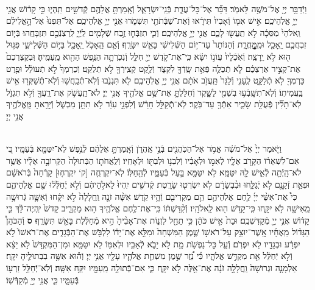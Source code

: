 \documentclass[twoside, openany, parskip=half, 11pt]{book}
\begin{document}
\begin{footnotesize}
\begin{multicols}{2}
\\
וַיְֿדַבֵּ֥ר יְיָ֖ אֶל־מֹשֶׁ֥ה לֵּאמֹֽר׃ דַּבֵּ֞ר אֶל־כׇּל־עֲדַ֧ת בְּֿנֵֽי־יִשְׂרָאֵ֛ל וְֿאָֽמַרְתָּ֥ אֲלֵהֶ֖ם קְֿדשִׁ֣ים תִּֽהְי֑וּ כִּ֣י קָד֔וֹשׁ אֲנִ֖י יְיָ֥ אֱלֹֽהֵיכֶֽם׃ אִ֣ישׁ אִמּ֤וֹ וְֿאָבִיו֙ תִּירָ֔אוּ וְֿאֶת־שַׁבְּֿתֹתַ֖י תִּשְׁמֹ֑רוּ אֲנִ֖י יְיָ֥ אֱלֹֽהֵיכֶֽם׃ אַל־תִּפְנוּ֙ אֶל־הָ֣אֱלִילִ֔ם וֵֽאלֹהֵי֙ מַסֵּכָ֔ה לֹ֥א תַֽעֲשׂ֖וּ לָכֶ֑ם אֲנִ֖י יְיָ֥ אֱלֹֽהֵיכֶֽם׃  וְֿכִ֧י תִזְבְּֿח֛וּ זֶ֥בַח שְֿׁלָמִ֖ים לַֽיְֿיָ֑ לִֽרְצֹֽנְֿכֶ֖ם תִּזְבָּחֻֽהוּ׃ בְּֿי֧וֹם זִבְחֲכֶ֛ם יֵֽאָכֵ֖ל וּמִֽמׇׇׇׇׇׇָּֽחֳרָ֑ת וְֿהַנּוֹתָר֙ עַד־י֣וֹם הַשְּֿׁלִישִׁ֔י בָּאֵ֖שׁ יִשָּׂרֵֽף׃ וְֿאִ֛ם הֵֽאָכֹ֥ל יֵֽאָכֵ֖ל בַּיּ֣וֹם הַשְּֿׁלִישִׁ֑י פִּגּ֥וּל ה֖וּא לֹ֥א יֵֽרָצֶֽה׃ וְֿאֹֽכְֿלָיו֙ עֲוֹנ֣וֹ יִשָּׂ֔א כִּֽי־אֶת־קֹ֥דֶשׁ יְיָ֖ חִלֵּ֑ל וְֿנִכְרְתָ֛ה הַנֶּ֥פֶשׁ הַהִ֖וא מֵֽעַמֶּֽיהָ׃ וּֽבְקֻצְרְכֶם֙ אֶת־קְצִ֣יר אַרְצְכֶ֔ם לֹ֧א תְֿכַלֶּ֛ה פְּֿאַ֥ת שָֽׂדְֿךָ֖ לִקְצֹ֑ר וְֿלֶ֥קֶט קְֿצִֽירְֿךָ֖ לֹ֥א תְֿלַקֵּֽט׃ וְֿכַרְמְךָ֙ לֹ֣א תְֿעוֹלֵ֔ל וּפֶ֥רֶט כַּרְמְךָ֖ לֹ֣א תְֿלַקֵּ֑ט לֶֽעָנִ֤י וְֿלַגֵּר֙ תַּֽעֲזֹ֣ב אֹתָ֔ם אֲנִ֖י יְיָ֥ אֱלֹֽהֵיכֶֽם׃  לֹ֖א תִּגְנֹ֑בוּ וְֿלֹֽא־תְֿכַֽחֲשׁ֥וּ וְֿלֹֽא־תְֿשַׁקְּר֖וּ אִ֥ישׁ בַּֽעֲמִיתֽוֹ׃ וְֿלֹֽא־תִשָּֽׁבְֿע֥וּ בִשְׁמִ֖י לַשָּׁ֑קֶר וְֿחִלַּלְתָּ֛ אֶת־שֵׁ֥ם אֱלֹהֶ֖יךָ אֲנִ֥י יְיָ׃ לֹא־תַֽעֲשֹׁ֥ק אֶת־רֵֽעֲךָ֖ וְֿלֹ֣א תִגְזֹ֑ל לֹֽא־תָלִ֞ין פְּֿעֻלַּ֥ת שָׂכִ֛יר אִתְּֿךָ֖ עַד־בֹּֽקֶר׃ לֹֽא־תְֿקַלֵּ֣ל חֵרֵ֔שׁ וְֿלִפְנֵ֣י עִוֵּ֔ר לֹ֥א תִתֵּ֖ן מִכְשֹׁ֑ל וְֿיָרֵ֥אתָ מֵּֽאֱלֹהֶ֖יךָ אֲנִ֥י יְיָ׃

\\
וַיֹּ֤אמֶר יְיָ֙ אֶל־מֹשֶׁ֔ה אֱמֹ֥ר אֶל־הַכֹּֽהֲנִ֖ים בְּֿנֵ֣י אַֽהֲרֹ֑ן וְֿאָֽמַרְתָּ֣ אֲלֵהֶ֔ם לְֿנֶ֥פֶשׁ לֹֽא־יִטַּמָּ֖א בְּֿעַמָּֽיו׃ כִּ֚י אִם־לִשְׁאֵר֔וֹ הַקָּרֹ֖ב אֵלָ֑יו לְֿאִמּ֣וֹ וּלְאָבִ֔יו וְֿלִבְנ֥וֹ וּלְבִתּ֖וֹ וּלְאָחִֽיו׃ וְֿלַֽאֲחֹת֤וֹ הַבְּֿתוּלָה֙ הַקְּֿרוֹבָ֣ה אֵלָ֔יו אֲשֶׁ֥ר לֹא־הָֽיְֿתָ֖ה לְֿאִ֑ישׁ לָ֖הּ יִטַּמָּֽא׃ לֹ֥א יִטַּמָּ֖א בַּ֣עַל בְּֿעַמָּ֑יו לְֿהֵ֖חַלּֽוֹ׃ לֹֽא־יִקְרְחֻ֤ה [ק‘ יִקְרְח֤וּ] קָרְֿחָה֙ בְּֿרֹאשָׁ֔ם וּפְאַ֥ת זְֿקָנָ֖ם לֹ֣א יְֿגַלֵּ֑חוּ וּבִ֨בְשָׂרָ֔ם לֹ֥א יִשְׂרְט֖וּ שָׂרָֽטֶת׃ קְֿדשִׁ֤ים יִֽהְיוּ֙ לֵאלֹ֣הֵיהֶ֔ם וְֿלֹ֣א יְֿחַלְּֿל֔וּ שֵׁ֖ם אֱלֹֽהֵיהֶ֑ם כִּי֩ אֶת־אִשֵּׁ֨י יְיָ֜ לֶ֧חֶם אֱלֹֽהֵיהֶ֛ם הֵ֥ם מַקְרִיבִ֖ם וְֿהָ֥יוּ קֹֽדֶשׁ׃  אִשָּׁ֨ה זֹנָ֤ה וַֽחֲלָלָה֙ לֹ֣א יִקָּ֔חוּ וְֿאִשָּׁ֛ה גְּֿרוּשָׁ֥ה מֵֽאִישָׁ֖הּ לֹ֣א יִקָּ֑חוּ כִּֽי־קָדֹ֥שׁ ה֖וּא לֵֽאלֹהָֽיו׃ וְֿקִ֨דַּשְׁתּ֔וֹ כִּֽי־אֶת־לֶ֥חֶם אֱלֹהֶ֖יךָ ה֣וּא מַקְרִ֑יב קָדשׁ֙ יִֽהְיֶה־לָּ֔ךְ כִּ֣י קָד֔וֹשׁ אֲנִ֥י יְיָ֖ מְֿקַדִּשְׁכֶֽם׃ וּבַת֙ אִ֣ישׁ כֹּהֵ֔ן כִּ֥י תֵחֵ֖ל לִזְנ֑וֹת אֶת־אָבִ֨יהָ֙ הִ֣יא מְֿחַלֶּ֔לֶת בָּאֵ֖שׁ תִּשָּׂרֵֽף׃ \textbf{ס} וְֿהַכֹּהֵן֩ הַגָּד֨וֹל מֵֽאֶחָ֜יו אֲֽשֶׁר־יוּצַ֥ק עַל־רֹאשׁ֣וֹ שֶׁ֤מֶן הַמִּשְׁחָה֙ וּמִלֵּ֣א אֶת־יָד֔וֹ לִלְבֹּ֖שׁ אֶת־הַבְּֿגָדִ֑ים אֶת־רֹאשׁוֹ֙ לֹ֣א יִפְרָ֔ע וּבְגָדָ֖יו לֹ֥א יִפְרֹֽם׃ וְֿעַ֛ל כׇּל־נַפְשֹׁ֥ת מֵ֖ת לֹ֣א יָבֹ֑א לְֿאָבִ֥יו וּלְאִמּ֖וֹ לֹ֥א יִטַּמָּֽא׃ וּמִן־הַמִּקְדָּשׁ֙ לֹ֣א יֵצֵ֔א וְֿלֹ֣א יְֿחַלֵּ֔ל אֵ֖ת מִקְדַּ֣שׁ אֱלֹהָ֑יו כִּ֡י נֵ֠זֶר שֶׁ֣מֶן מִשְׁחַ֧ת אֱלֹהָ֛יו עָלָ֖יו אֲנִ֥י יְיָ׃  וְֿה֕וּא אִשָּׁ֥ה בִבְתוּלֶ֖יהָ יִקָּֽח׃ אַלְמָנָ֤ה וּגְרוּשָׁה֙ וַֽחֲלָלָ֣ה זֹנָ֔ה אֶת־אֵ֖לֶּה לֹ֣א יִקָּ֑ח כִּ֛י אִם־בְּֿתוּלָ֥ה מֵֽעַמָּ֖יו יִקַּ֥ח אִשָּֽׁה׃ וְֿלֹֽא־יְֿחַלֵּ֥ל זַרְע֖וֹ בְּֿעַמָּ֑יו כִּ֛י אֲנִ֥י יְיָ֖ מְֿקַדְּֿשֽׁוֹ׃


\end{multicols}
\end{footnotesize}
\end{document}
